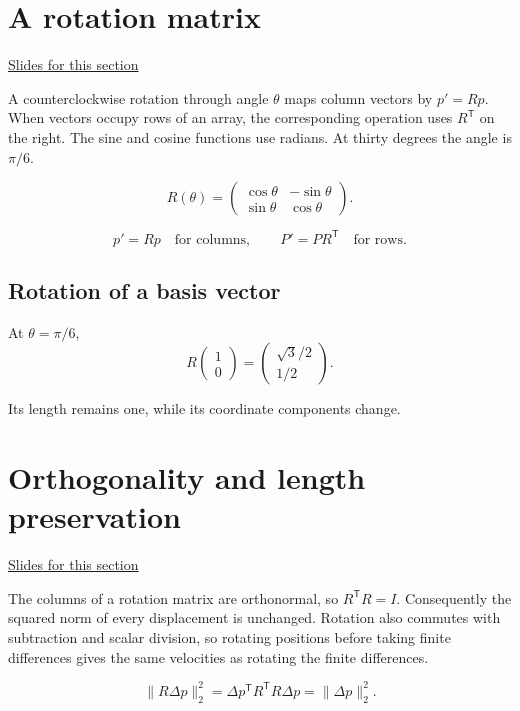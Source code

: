 \documentclass[11pt,letterpaper]{article}
\theoremstyle{definition}\newtheorem{definition}{Definition}\newtheorem{example}{Example}
\numberwithin{equation}{section}
\begin{document}
\section{A rotation matrix}
\hypertarget{note-a-rotation-matrix}{}\label{note:a-rotation-matrix}
{\small \href{slides.html\#frame=trajectory-rotation-figure\&step=1}{Slides for this section}}\par
A counterclockwise rotation through angle $\theta$ maps column vectors by $p'=Rp$. When vectors occupy rows of an array, the corresponding operation uses $R^{\mathsf T}$ on the right. The sine and cosine functions use radians. At thirty degrees the angle is $\pi/6$.

\[
R(\theta)=\begin{pmatrix}\cos\theta&-\sin\theta\\\sin\theta&\cos\theta\end{pmatrix}.
\]

\[
p'=Rp\quad\text{for columns},\qquad P'=PR^{\mathsf T}\quad\text{for rows}.
\]

\subsection*{Rotation of a basis vector}
At $\theta=\pi/6$,
\[
R\begin{pmatrix}1\\0\end{pmatrix}=\begin{pmatrix}\sqrt3/2\\1/2\end{pmatrix}.
\]

Its length remains one, while its coordinate components change.
\section{Orthogonality and length preservation}
\hypertarget{note-orthogonality-and-length-preservation}{}\label{note:orthogonality-and-length-preservation}
{\small \href{slides.html\#frame=orthogonality-and-length-preservation\&step=1}{Slides for this section}}\par
The columns of a rotation matrix are orthonormal, so $R^{\mathsf T}R=I$. Consequently the squared norm of every displacement is unchanged. Rotation also commutes with subtraction and scalar division, so rotating positions before taking finite differences gives the same velocities as rotating the finite differences.

\[
\|R\Delta p\|_2^2=\Delta p^{\mathsf T}R^{\mathsf T}R\Delta p=\|\Delta p\|_2^2.
\]
\end{document}
